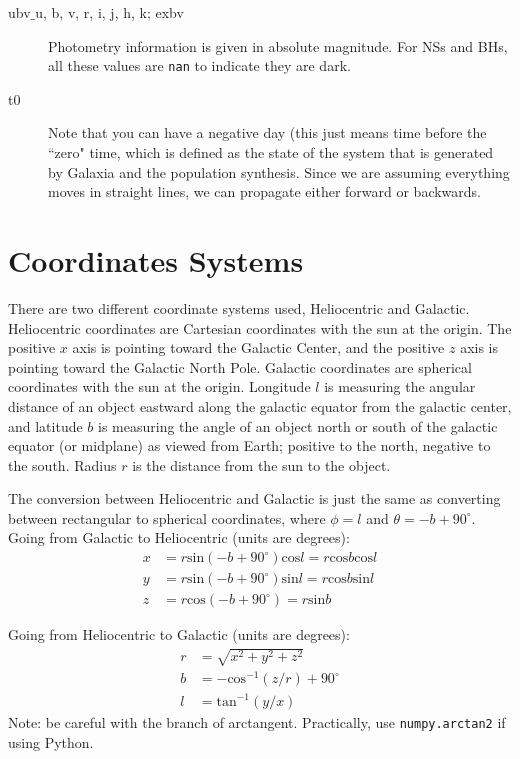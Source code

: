 \documentclass{scrartcl}
\begin{document}
\begin{description}
    \item [ubv$\_$u, b, v, r, i, j, h, k; exbv] Photometry information is given in absolute magnitude. For NSs and BHs, all these values are \texttt{nan} to indicate they are dark.
    
    \item [t0] Note that you can have a negative day (this just means time before the ``zero" time, which is defined as the state of the system that is generated by Galaxia and the population synthesis. Since we are assuming everything moves in straight lines, we can propagate either forward or backwards.
 \end{description}

\newpage
 
\section{Coordinates Systems} 
There are two different coordinate systems used, Heliocentric and Galactic. 
Heliocentric coordinates are Cartesian coordinates with the sun at the origin. The positive $x$ axis is pointing toward the Galactic Center, and the positive $z$ axis is pointing toward the Galactic North Pole.
Galactic coordinates are spherical coordinates with the sun at the origin. 
Longitude $l$ is measuring the angular distance of an object eastward along the galactic equator from the galactic center, and latitude $b$ is measuring the angle of an object north or south of the galactic equator (or midplane) as viewed from Earth; positive to the north, negative to the south. 
Radius $r$ is the distance from the sun to the object. 

The conversion between Heliocentric and Galactic is just the same as converting between rectangular to spherical coordinates, where $\phi = l$ and $\theta = -b + 90^\circ$.
Going from Galactic to Heliocentric (units are degrees):
\begin{align*}
    x &= r \mathrm{sin}(-b + 90^\circ) \mathrm{cos}l =  r \mathrm{cos}b \mathrm{cos}l  \\
    y &= r \mathrm{sin}(-b + 90^\circ) \mathrm{sin}l = r \mathrm{cos}b \mathrm{sin}l \\
    z &= r \mathrm{cos}(-b + 90^\circ) = r \mathrm{sin}b
\end{align*}

Going from Heliocentric to Galactic (units are degrees):
\begin{align*}
    r &= \sqrt{x^2 + y^2 + z^2} \\
    b &= -\mathrm{cos}^{-1}(z/r) + 90^\circ \\
    l &= \mathrm{tan}^{-1}(y/x)
\end{align*}
Note: be careful with the branch of arctangent. Practically, use \texttt{numpy.arctan2} if using Python.
\end{document}

